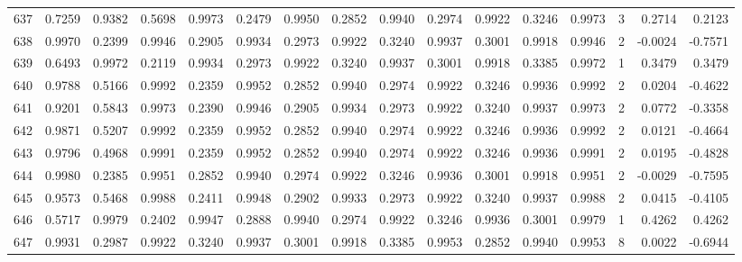 \begin{tabular}{lrrrrrrrrrrrrrrr}
637 &      0.7259 &  0.9382 &  0.5698 &  0.9973 &  0.2479 &  0.9950 &  0.2852 &  0.9940 &  0.2974 &  0.9922 &   0.3246 &     0.9973 &      3 &                    0.2714 &                     0.2123 \\
638 &      0.9970 &  0.2399 &  0.9946 &  0.2905 &  0.9934 &  0.2973 &  0.9922 &  0.3240 &  0.9937 &  0.3001 &   0.9918 &     0.9946 &      2 &                   -0.0024 &                    -0.7571 \\
639 &      0.6493 &  0.9972 &  0.2119 &  0.9934 &  0.2973 &  0.9922 &  0.3240 &  0.9937 &  0.3001 &  0.9918 &   0.3385 &     0.9972 &      1 &                    0.3479 &                     0.3479 \\
640 &      0.9788 &  0.5166 &  0.9992 &  0.2359 &  0.9952 &  0.2852 &  0.9940 &  0.2974 &  0.9922 &  0.3246 &   0.9936 &     0.9992 &      2 &                    0.0204 &                    -0.4622 \\
641 &      0.9201 &  0.5843 &  0.9973 &  0.2390 &  0.9946 &  0.2905 &  0.9934 &  0.2973 &  0.9922 &  0.3240 &   0.9937 &     0.9973 &      2 &                    0.0772 &                    -0.3358 \\
642 &      0.9871 &  0.5207 &  0.9992 &  0.2359 &  0.9952 &  0.2852 &  0.9940 &  0.2974 &  0.9922 &  0.3246 &   0.9936 &     0.9992 &      2 &                    0.0121 &                    -0.4664 \\
643 &      0.9796 &  0.4968 &  0.9991 &  0.2359 &  0.9952 &  0.2852 &  0.9940 &  0.2974 &  0.9922 &  0.3246 &   0.9936 &     0.9991 &      2 &                    0.0195 &                    -0.4828 \\
644 &      0.9980 &  0.2385 &  0.9951 &  0.2852 &  0.9940 &  0.2974 &  0.9922 &  0.3246 &  0.9936 &  0.3001 &   0.9918 &     0.9951 &      2 &                   -0.0029 &                    -0.7595 \\
645 &      0.9573 &  0.5468 &  0.9988 &  0.2411 &  0.9948 &  0.2902 &  0.9933 &  0.2973 &  0.9922 &  0.3240 &   0.9937 &     0.9988 &      2 &                    0.0415 &                    -0.4105 \\
646 &      0.5717 &  0.9979 &  0.2402 &  0.9947 &  0.2888 &  0.9940 &  0.2974 &  0.9922 &  0.3246 &  0.9936 &   0.3001 &     0.9979 &      1 &                    0.4262 &                     0.4262 \\
647 &      0.9931 &  0.2987 &  0.9922 &  0.3240 &  0.9937 &  0.3001 &  0.9918 &  0.3385 &  0.9953 &  0.2852 &   0.9940 &     0.9953 &      8 &                    0.0022 &                    -0.6944 \\

\end{tabular}
